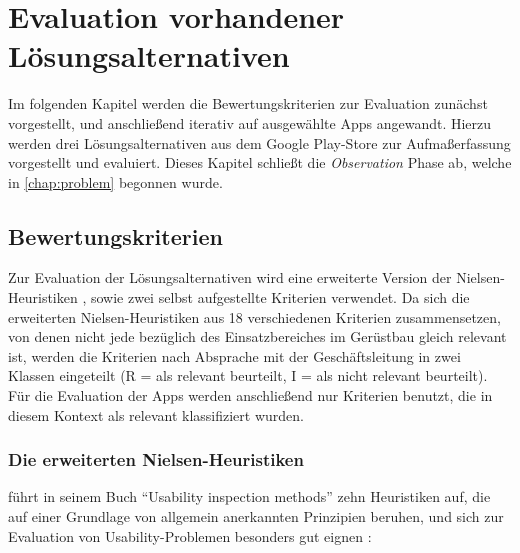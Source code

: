 \chapter{Evaluation vorhandener Lösungsalternativen}\label{chap:eval}
Im folgenden Kapitel werden die Bewertungskriterien zur Evaluation zunächst vorgestellt, und anschließend iterativ auf ausgewählte Apps angewandt.
Hierzu werden drei Lösungsalternativen aus dem Google Play-Store zur Aufmaßerfassung vorgestellt und evaluiert.
Dieses Kapitel schließt die \emph{Observation} Phase ab, welche in \autoref{chap:problem} begonnen wurde. 

\section{Bewertungskriterien}\label{sec:criteria}
Zur Evaluation der Lösungsalternativen wird eine erweiterte Version der Nielsen-Heuristiken \citep{Nielsen94}, sowie zwei selbst aufgestellte Kriterien verwendet. 
Da sich die erweiterten Nielsen-Heuristiken aus 18 verschiedenen Kriterien zusammensetzen, von denen nicht jede bezüglich des Einsatzbereiches im Gerüstbau gleich relevant ist, werden die Kriterien nach Absprache mit der Geschäftsleitung in zwei Klassen eingeteilt (R = als relevant beurteilt, I = als nicht relevant beurteilt).
Für die Evaluation der Apps werden anschließend nur Kriterien benutzt, die in diesem Kontext als relevant klassifiziert wurden.

\subsection{Die erweiterten Nielsen-Heuristiken}\label{subsec:nielsen}
\citeauthor{Nielsen94} führt in seinem Buch ``Usability inspection methods'' zehn Heuristiken auf, die auf einer Grundlage von allgemein anerkannten Prinzipien beruhen, und sich zur Evaluation von Usability-Problemen besonders gut eignen \citep[Seite 25--62]{Nielsen94}: 

\begin{enumerate}
\end{enumerate} 

